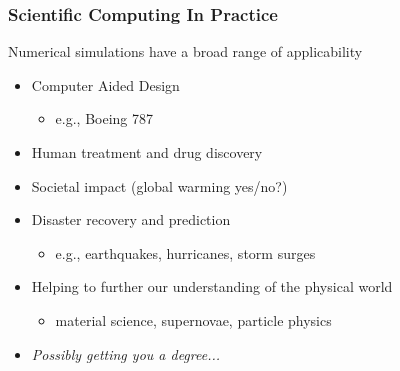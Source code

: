 \documentclass[mathserif]{beamer}
\begin{document}
\begin{frame}
  \frametitle{Scientific Computing In Practice}

  \begin{block}{Numerical simulations have a broad range of applicability}
    \begin{itemize}
    \item Computer Aided Design 
	  \begin{itemize}
	   \item e.g., Boeing 787
	  \end{itemize}
    \item Human treatment and drug discovery
    \item Societal impact (global warming yes/no?)
    \item Disaster recovery and prediction 
	  \begin{itemize}
	   \item e.g., earthquakes, hurricanes, storm surges
	  \end{itemize}
    \item Helping to further our understanding of the physical world
	  \begin{itemize}
	   \item material science, supernovae, particle physics
	  \end{itemize}

    \item {\em Possibly getting you a degree...}
    \end{itemize}
\end{block}
\end{frame}
\end{document}
